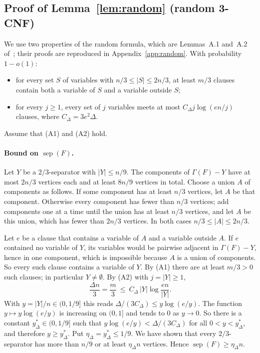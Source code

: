 \documentclass[11pt,a4paper]{article}
\theoremstyle{definition}
\theoremstyle{remark}
\newcommand{\sep}{\operatorname{sep}}
\newcommand{\Gr}{\Gamma}
\begin{document}
\subsection{Proof of Lemma~\ref{lem:random} (random 3-CNF)}

We use two properties of the random formula, which are Lemmas~A.1 and~A.2 of~\cite{DL};
their proofs are reproduced in Appendix~\ref{app:random}. With probability $1-o(1)$:
\begin{itemize}
\item[(A1)] for every set $S$ of variables with $n/3\le|S|\le2n/3$, at least $m/3$ clauses
 contain both a variable of $S$ and a variable outside $S$;
\item[(A2)] for every $j\ge1$, every set of $j$ variables meets at most $C_\Delta j\log(en/j)$
 clauses, where $C_\Delta=3e^2\Delta$.
\end{itemize}
Assume that (A1) and (A2) hold.

\paragraph{Bound on $\sep(F)$.} Let $Y$ be a $2/3$-separator with $|Y|\le n/9$. The
components of $\Gr(F)-Y$ have at most $2n/3$ vertices each and at least $8n/9$ vertices in
total. Choose a union $A$ of components as follows. If some component has at least $n/3$
vertices, let $A$ be that component. Otherwise every component has fewer than $n/3$
vertices; add components one at a time until the union has at least $n/3$ vertices, and let
$A$ be this union, which has fewer than $2n/3$ vertices. In both cases $n/3\le|A|\le2n/3$.

Let $e$ be a clause that contains a variable of $A$ and a variable outside $A$. If $e$
contained no variable of $Y$, its variables would be pairwise adjacent in $\Gr(F)-Y$, hence
in one component, which is impossible because $A$ is a union of components. So every such
clause contains a variable of $Y$. By (A1) there are at least $m/3>0$ such clauses; in
particular $Y\ne\emptyset$. By (A2) with $j=|Y|\ge1$,
\[
\frac{\Delta n}{3}=\frac m3\ \le\ C_\Delta\,|Y|\log\frac{en}{|Y|} .
\]
With $y=|Y|/n\in(0,1/9]$ this reads $\Delta/(3C_\Delta)\le y\log(e/y)$. The function
$y\mapsto y\log(e/y)$ is increasing on $(0,1]$ and tends to $0$ as $y\to0$. So there is a
constant $y^*_\Delta\in(0,1/9]$ such that $y\log(e/y)<\Delta/(3C_\Delta)$ for all
$0<y<y^*_\Delta$, and therefore $y\ge y^*_\Delta$. Put $\eta_\Delta=y^*_\Delta\le1/9$. We
have shown that every $2/3$-separator has more than $n/9$ or at least $\eta_\Delta n$
vertices. Hence $\sep(F)\ge\eta_\Delta n$.
\end{document}
